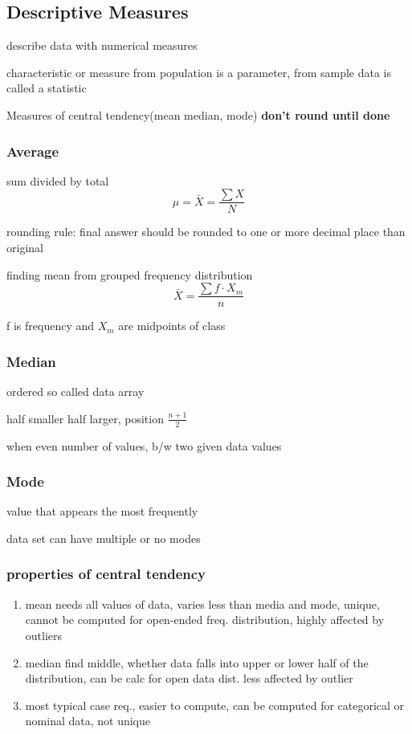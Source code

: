 \documentclass[11pt]{amsart}
\begin{document}
\subsection{Descriptive Measures}
\par describe data with numerical measures
\par characteristic or measure from population is a parameter, from sample
data is called a statistic
\par Measures of central tendency(mean median, mode)
\textbf{don't round until done}
\subsubsection{Average}
\par sum divided by total
\begin{equation*}
  \mu = \bar{X} = \frac{\sum{X}}{N}
\end{equation*}
\par rounding rule: final answer should be rounded to one or more decimal
place than original
\par finding mean from grouped frequency distribution
\begin{equation}
  \bar{X} = \frac{\sum{f \cdot X_m}}{n}
\end{equation}
\par f is frequency and $X_m$ are midpoints of class
\subsubsection{Median}
\par ordered so called data array
\par half smaller half larger, position $\frac{n+1}{2}$
\par when even number of values, b/w two given data values
\subsubsection{Mode}
\par value that appears the most frequently
\par data set can have multiple or no modes
\subsubsection{properties of central tendency}
\begin{enumerate}
  \item mean needs all values of data, varies less than media and mode, unique, cannot be computed for open-ended freq. distribution, highly affected by outliers
  \item median find middle, whether data falls into upper or lower half of the distribution, can be calc for open data dist. less affected by outlier
  \item most typical case req., easier to compute, can be computed for categorical or nominal data, not unique
\end{enumerate}
\end{document}
